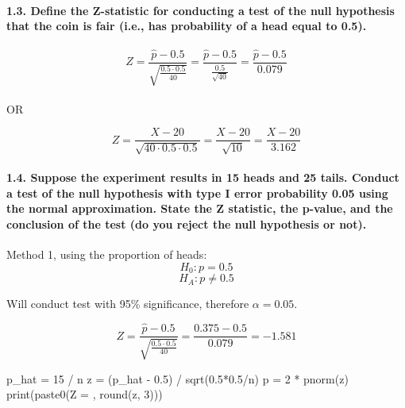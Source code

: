 \documentclass[
]{article}
\newenvironment{Shaded}{\begin{snugshade}}{\end{snugshade}}
\newcommand{\DecValTok}[1]{\textcolor[rgb]{0.00,0.00,0.81}{#1}}
\newcommand{\FloatTok}[1]{\textcolor[rgb]{0.00,0.00,0.81}{#1}}
\newcommand{\FunctionTok}[1]{\textcolor[rgb]{0.00,0.00,0.00}{#1}}
\newcommand{\NormalTok}[1]{#1}
\newcommand{\OtherTok}[1]{\textcolor[rgb]{0.56,0.35,0.01}{#1}}
\newcommand{\SpecialCharTok}[1]{\textcolor[rgb]{0.00,0.00,0.00}{#1}}
\newcommand{\StringTok}[1]{\textcolor[rgb]{0.31,0.60,0.02}{#1}}
\begin{document}
\hypertarget{define-the-z-statistic-for-conducting-a-test-of-the-null-hypothesis-that-the-coin-is-fair-i.e.-has-probability-of-a-head-equal-to-0.5.}{%
\paragraph{1.3. Define the Z-statistic for conducting a test of the null
hypothesis that the coin is fair (i.e., has probability of a head equal
to
0.5).}\label{define-the-z-statistic-for-conducting-a-test-of-the-null-hypothesis-that-the-coin-is-fair-i.e.-has-probability-of-a-head-equal-to-0.5.}}

\[Z = \frac{\hat{p} - 0.5}{\sqrt{\frac{0.5 \cdot0.5}{40}}} = \frac{\hat{p} - 0.5}{\frac{0.5}{\sqrt{40}}} = \frac{\hat{p}-0.5}{0.079}\]\\
OR

\[Z = \frac{X - 20}{\sqrt{40 \cdot0.5 \cdot0.5}}= \frac{X - 20}{\sqrt{10}} = \frac{X - 20}{3.162}\]

\hypertarget{suppose-the-experiment-results-in-15-heads-and-25-tails.-conduct-a-test-of-the-null-hypothesis-with-type-i-error-probability-0.05-using-the-normal-approximation.-state-the-z-statistic-the-p-value-and-the-conclusion-of-the-test-do-you-reject-the-null-hypothesis-or-not.}{%
\paragraph{1.4. Suppose the experiment results in 15 heads and 25 tails.
Conduct a test of the null hypothesis with type I error probability 0.05
using the normal approximation. State the Z statistic, the p-value, and
the conclusion of the test (do you reject the null hypothesis or
not).}\label{suppose-the-experiment-results-in-15-heads-and-25-tails.-conduct-a-test-of-the-null-hypothesis-with-type-i-error-probability-0.05-using-the-normal-approximation.-state-the-z-statistic-the-p-value-and-the-conclusion-of-the-test-do-you-reject-the-null-hypothesis-or-not.}}

Method 1, using the proportion of heads: \[H_0: p=0.5\]
\[H_A: p \neq 0.5\]

Will conduct test with 95\% significance, therefore \(\alpha = 0.05\).

\[Z = \frac{\hat{p} - 0.5}{\sqrt{\frac{0.5 \cdot0.5}{40}}} = \frac{0.375-0.5}{0.079}=-1.581\]

\begin{Shaded}
\begin{Highlighting}[]
\NormalTok{p\_hat }\OtherTok{=} \DecValTok{15} \SpecialCharTok{/}\NormalTok{ n}
\NormalTok{z }\OtherTok{=}\NormalTok{ (p\_hat }\SpecialCharTok{{-}} \FloatTok{0.5}\NormalTok{) }\SpecialCharTok{/} \FunctionTok{sqrt}\NormalTok{(}\FloatTok{0.5}\SpecialCharTok{*}\FloatTok{0.5}\SpecialCharTok{/}\NormalTok{n)}
\NormalTok{p }\OtherTok{=} \DecValTok{2} \SpecialCharTok{*} \FunctionTok{pnorm}\NormalTok{(z)}
\FunctionTok{print}\NormalTok{(}\FunctionTok{paste0}\NormalTok{(}\StringTok{\textquotesingle{}Z = \textquotesingle{}}\NormalTok{, }\FunctionTok{round}\NormalTok{(z, }\DecValTok{3}\NormalTok{)))}
\end{Highlighting}
\end{Shaded}
\end{document}

